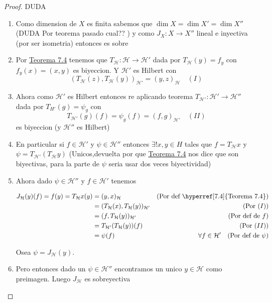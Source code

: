 \documentclass[10pt]{extarticle}
\theoremstyle{break}
\theoremstyle{definition}
\begin{document}
\begin{proof} DUDA
\begin{enumerate}
\item
Como dimension de $X$ es finita sabemos que $\dim X=\dim X'=\dim X''$ (DUDA Por teorema pasado cual?? ) y como $J_{X}:X\rightarrow X''$ lineal e inyectiva (por ser isometria) entonces es sobre
\item Por \hyperref[7.4]{Teorema 7.4} tenemos que $T_{\mathcal{H}}:\mathcal{H}\rightarrow \mathcal{H}'$ dada por $T_{\mathcal{H}}(y)=f_{y}$ con $f_{y}(x)=(x,y)$ es biyeccion. Y $\mathcal{H}'$ es Hilbert con
$$(T_{\mathcal{H}}(z),T_{\mathcal{H}}(y))_{\mathcal{H}'}=(y,z)_{\mathcal{H}}\quad(I)$$

\item Ahora como $\mathcal{H}'$ es Hilbert entonces re aplicando teorema $T_{\mathcal{H}'}:\mathcal{H}'\rightarrow\mathcal{H}''$ dada por $T_{H'}(g)=\psi_{g}$ con
$$T_{\mathcal{H}'}(g)(f)=\psi_{g}(f)=(f,g)_{\mathcal{H}'}\quad (II)$$
es biyeccion (y $\mathcal{H}''$ es Hilbert)
\item En particular si $f\in \mathcal{H}'$ y $\psi \in \mathcal{H}''$ entonces $\exists !x,y\in H$ tales que $f=T_{\mathcal{H}}x$ y $\psi=T_{\mathcal{H}'}(T_{\mathcal{H}}y)$ (Unicos,devuelta por que \hyperref[7.4]{Teorema 7.4} nos dice que son biyectivas, para la parte de $\psi$ seria usar dos veces biyectividad)
\item Ahora dado $\psi \in \mathcal{H}''$ y $f\in \mathcal{H}'$ tenemos

\begin{align*} 
	J_{\mathcal{H}}(y)(f)= f(y)=T_{\mathcal{H}}x(y)&=(y,x)_{\mathcal{H}} & \text{(Por def \hyperref[7.4]{Teorema 7.4})} \\
	&=(T_{\mathcal{H}}(x),T_{\mathcal{H}}(y))_{\mathcal{H}'} &(\text{Por } (I))\\ 
	&=(f,T_{\mathcal{H}}(y))_{\mathcal{H}'} & (\text{Por def de }f)\\
	& =T_{\mathcal{H}'}(T_{\mathcal{H}}(y))(f) &(\text{Por } (II)) \\
	&=\psi (f)&\forall f\in \mathcal{H}' \quad(\text{Por def de }\psi)
\end{align*}

Osea $\psi = J_{\mathcal{H}}(y)$. 
		\item Pero entonces dado un $\psi \in \mathcal{H}''$ encontramos un unico $y\in \mathcal{H}$ como preimagen. Luego $J_{\mathcal{H}}$ es sobreyectiva 

\end{enumerate}
\end{proof}
\end{document}

